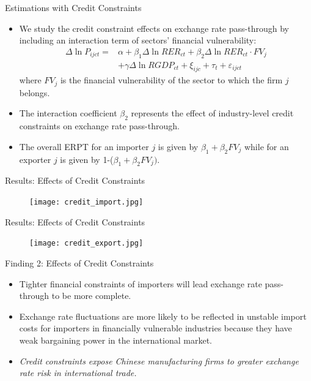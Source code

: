 \documentclass[10pt]{beamer}
\begin{document}
\begin{frame}{Estimations with Credit Constraints}
	\begin{itemize}
		\item We study the credit constraint effects on exchange rate pass-through by including an interaction term of sectors’ financial vulnerability:
		\begin{equation}
			\begin{aligned}
				\Delta \ln P_{ijct}=&\alpha+\beta_{1} \Delta \ln RER_{ct}+\beta_{2} \Delta \ln RER_{ct} \cdot FV_{j} \\ &+\gamma \Delta \ln RGDP_{ct}+\xi_{ijc}+\tau_{t} +\varepsilon_{ijct}
			\end{aligned}
			\label{eq.credit}
		\end{equation}
		{\footnotesize where $FV_{j}$ is the financial vulnerability of the sector to which the firm $j$ belongs.}
		\item The interaction coefficient $\beta_2$ represents the effect of industry-level credit constraints on exchange rate pass-through.
		\item The overall ERPT for an importer $j$ is given by $\beta_{1} +\beta_{2} FV_j$ while for an exporter $j$ is given by 1-($\beta_{1} +\beta_{2} FV_j)$.
	\end{itemize}
\end{frame}

\begin{frame}{Results: Effects of Credit Constraints}
	\begin{figure}[htbp]
		\centering
		\texttt{[image: credit\_import.jpg]}
		\label{credit.imp}
	\end{figure}
\end{frame}

\begin{frame}{Results: Effects of Credit Constraints}
	\begin{figure}[htbp]
		\centering
		\texttt{[image: credit\_export.jpg]}
		\label{credit.exp}
	\end{figure}
\end{frame}

\begin{frame}{Finding 2: Effects of Credit Constraints}
	\begin{tcolorbox}[colback=blue!5!white, colframe=blue!75!black,title=Key Finding 2]
		\begin{itemize}
			\item Tighter financial constraints of importers will lead exchange rate pass-through to be more complete.
		\end{itemize}
	\end{tcolorbox}
	\begin{itemize}
		\item Exchange rate fluctuations are more likely to be reflected in unstable import costs for importers in financially vulnerable industries because they have weak bargaining power in the international market.
		\item \textit{Credit constraints expose Chinese manufacturing firms to greater exchange rate risk in international trade.}
	\end{itemize}
\end{frame}
\end{document}
